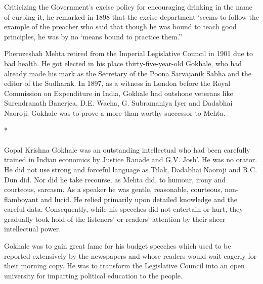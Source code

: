Criticizing the Government's excise policy for encouraging drinking in the name of curbing it, he remarked in 1898 that the excise department `seems to follow the example of the preacher who said that though he was bound to teach good principles, he was by no `means bound to practice them.''

Pherozeshah Mehta retired from the Imperial Legislative Council in 1901 due to bad health. He got elected in his place thirty-five-year-old Gokhale, who had already made his mark as the Secretary of the Poona Sarvajanik Sabha and the editor of the Sudharak. In 1897, as a witness in London before the Royal Commission on Expenditure in India, Gokhale had outshone veterans like Surendranath Banerjea, D.E. Wacha, G. Subramaniya Iyer and Dadabhai Naoroji. Gokhale was to prove a more than worthy successor to Mehta.

\begin{center}*\end{center}

\paragraph*{}


Gopal Krishna Gokhale was an outstanding intellectual who had been carefully trained in Indian economics by Justice Ranade and G.V. Josh'. He was no orator. He did not use strong and forceful language as Tilak, Dadabhai Naoroji and R.C. Dun did. Nor did he take recourse, as Mehta did, to humour, irony and courteous, sarcasm. As a speaker he was gentle, reasonable, courteous, non-flamboyant and lucid. He relied primarily upon detailed knowledge and the careful data. Consequently, while his speeches did not entertain or hurt, they gradually took hold of the listeners' or readers' attention by their sheer intellectual power.

Gokhale was to gain great fame for his budget speeches which used to be reported extensively by the newspapers and whose readers would wait eagerly for their morning copy. He was to transform the Legislative Council into an open university for imparting political education to the people.

